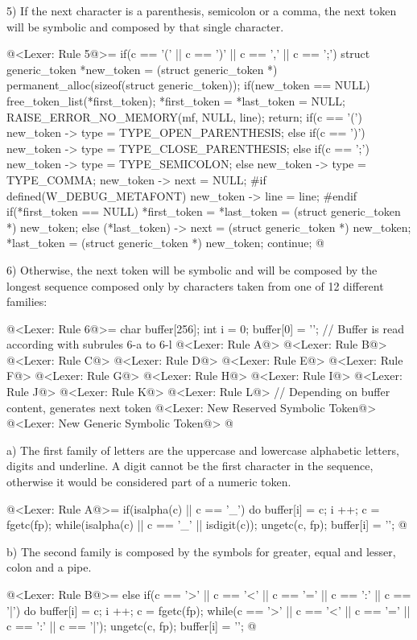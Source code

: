 5) If the next character is a parenthesis, semicolon or a comma, the
next token will be symbolic and composed by that single character.

\iniciocodigo
@<Lexer: Rule 5@>=
if(c == '(' || c == ')' || c == ',' || c == ';'){
  struct generic_token *new_token =
     (struct generic_token *) permanent_alloc(sizeof(struct generic_token));
  if(new_token == NULL){
    free_token_list(*first_token);
    *first_token = *last_token = NULL;
    RAISE_ERROR_NO_MEMORY(mf, NULL,  line);
    return;
  }
  if(c == '(')
    new_token -> type = TYPE_OPEN_PARENTHESIS;
  else if(c == ')')
    new_token -> type = TYPE_CLOSE_PARENTHESIS;
  else if(c == ';')
    new_token -> type = TYPE_SEMICOLON;
  else
    new_token -> type = TYPE_COMMA;
  new_token -> next = NULL;
#if defined(W_DEBUG_METAFONT)
  new_token -> line = line;
#endif
  if(*first_token == NULL)
    *first_token = *last_token = (struct generic_token *) new_token;
  else{
    (*last_token) -> next = (struct generic_token *) new_token;
    *last_token = (struct generic_token *) new_token;
  }
  continue;
}
@
\fimcodigo

6) Otherwise, the next token will be symbolic and will be composed by
the longest sequence composed only by characters taken from one of 12
different families:

\iniciocodigo
@<Lexer: Rule 6@>=
{
  char buffer[256];
  int i = 0;
  buffer[0] = '\0';
  // Buffer is read according with subrules 6-a to 6-l
  @<Lexer: Rule A@>
  @<Lexer: Rule B@>
  @<Lexer: Rule C@>
  @<Lexer: Rule D@>
  @<Lexer: Rule E@>
  @<Lexer: Rule F@>
  @<Lexer: Rule G@>
  @<Lexer: Rule H@>
  @<Lexer: Rule I@>
  @<Lexer: Rule J@>
  @<Lexer: Rule K@>
  @<Lexer: Rule L@>
  // Depending on buffer content, generates next token
  @<Lexer: New Reserved Symbolic Token@>
  @<Lexer: New Generic Symbolic Token@>
}
@
\fimcodigo

a) The first family of letters are the uppercase and lowercase
alphabetic letters, digits and underline. A digit cannot be the first
character in the sequence, otherwise it would be considered part of a
numeric token.

\iniciocodigo
@<Lexer: Rule A@>=
if(isalpha(c) || c == '_'){
  do{
    buffer[i] = c;
    i ++;
    c = fgetc(fp);
  } while(isalpha(c) || c == '_' || isdigit(c));
  ungetc(c, fp);
  buffer[i] = '\0';
}
@
\fimcodigo

b) The second family is composed by the symbols for greater, equal and
lesser, colon and a pipe.

\iniciocodigo
@<Lexer: Rule B@>=
else if(c == '>' || c == '<' || c == '=' || c == ':' || c == '|'){
  do{
    buffer[i] = c;
    i ++;
    c = fgetc(fp);
  } while(c == '>' || c == '<' || c == '=' || c == ':' || c == '|');
  ungetc(c, fp);
  buffer[i] = '\0';
}
@
\fimcodigo


